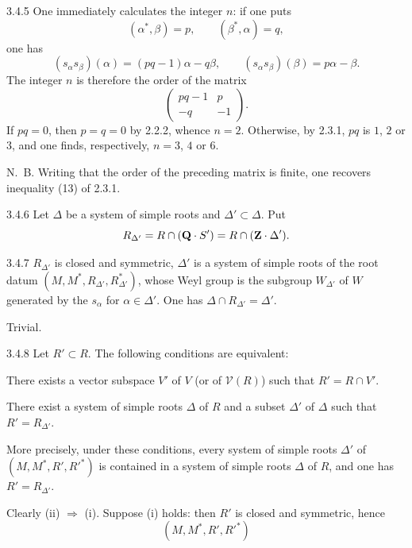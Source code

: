 \begin{remark}{3.4.5}\label{XXI.3.4.5}
One immediately calculates the integer $n$: if one puts
\[
(\alpha^*,\beta)=p,\qquad(\beta^*,\alpha)=q,
\]
one has{\renewcommand{\thefootnote}{(11)}}
\[
(s_\alpha s_\beta)(\alpha)=(pq-1)\alpha-q\beta,\qquad(s_\alpha s_\beta)(\beta)=p\alpha-\beta.
\]
The integer $n$ is therefore the order of the matrix
\[
\begin{pmatrix}pq-1&p\\-q&-1\end{pmatrix}.
\]
If $pq=0$, then $p=q=0$ by 2.2.2, whence $n=2$. Otherwise, by 2.3.1, $pq$ is $1$, $2$ or $3$, and one finds, respectively, $n=3$, $4$ or $6$.

N.~B. Writing that the order of the preceding matrix is finite, one recovers inequality (13) of 2.3.1.
\end{remark}
\begin{definition}{3.4.6}\label{XXI.3.4.6}
Let $\Delta$ be a system of simple roots and $\Delta'\subset\Delta$. Put
\[
R_{\Delta'}=R\cap(\mathbf{Q}\cdot S')=R\cap(\mathbf{Z}\cdot\Delta').
\]
\end{definition}
\begin{lemma}{3.4.7}\label{XXI.3.4.7}
$R_{\Delta'}$ is closed and symmetric, $\Delta'$ is a system of simple roots of the root datum $(M,M^*,R_{\Delta'},R^*_{\Delta'})$, whose Weyl group is the subgroup $W_{\Delta'}$ of $W$ generated by the $s_\alpha$ for $\alpha\in\Delta'$. One has $\Delta\cap R_{\Delta'}=\Delta'$.
\end{lemma}
Trivial.
\begin{proposition}{3.4.8}\label{XXI.3.4.8}
Let $R'\subset R$. The following conditions are equivalent:
\begin{enumeratei}
\item There exists a vector subspace $V'$ of $V$ (or of $\mathcal V(R)$) such that $R'=R\cap V'$.
\item There exist a system of simple roots $\Delta$ of $R$ and a subset $\Delta'$ of $\Delta$ such that $R'=R_{\Delta'}$.
\end{enumeratei}
More precisely, under these conditions, every system of simple roots $\Delta'$ of $(M,M^*,R',R'^*)$ is contained in a system of simple roots $\Delta$ of $R$, and one has $R'=R_{\Delta'}$.
\end{proposition}
Clearly (ii) $\Rightarrow$ (i). Suppose (i) holds: then $R'$ is closed and symmetric, hence
\[(M,M^*,R',R'^*)\]
